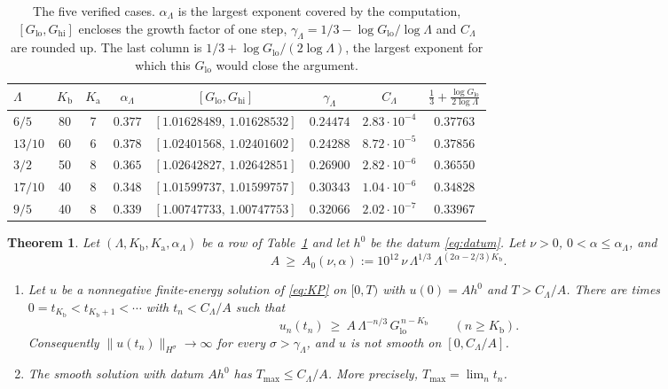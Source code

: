 \documentclass[12pt,reqno]{amsart}
\numberwithin{equation}{section}
\theoremstyle{plain}
\newtheorem{theorem}{Theorem}[section]
\theoremstyle{definition}
\theoremstyle{remark}
\newcommand{\Kb}{K_{\mathrm b}}
\newcommand{\Ka}{K_{\mathrm a}}
\newcommand{\Glo}{G_{\mathrm{lo}}}
\newcommand{\Ghi}{G_{\mathrm{hi}}}
\begin{document}
\begin{table}[ht]
\centering\small
\caption{The five verified cases. $\alpha_\Lambda$ is the largest exponent
covered by the computation, $[\Glo,\Ghi]$ encloses the growth factor of
one step, $\gamma_\Lambda=1/3-\log\Glo/\log\Lambda$ and $C_\Lambda$ are
rounded up. The last column is $1/3+\log\Glo/(2\log\Lambda)$, the
largest exponent for which this $\Glo$ would close the argument.}
\label{tab:main}
\begin{tabular}{@{}lccclccc@{}}
\toprule
$\Lambda$ & $\Kb$ & $\Ka$ & $\alpha_\Lambda$ & \multicolumn{1}{c}{$[\Glo,\Ghi]$} & $\gamma_\Lambda$ & $C_\Lambda$ & $\tfrac13+\tfrac{\log\Glo}{2\log\Lambda}$\\
\midrule
$6/5$   & 80 & 7 & $0.377$ & $[1.01628489,\,1.01628532]$ & $0.24474$ & $2.83\cdot10^{-4}$ & $0.37763$\\
$13/10$ & 60 & 6 & $0.378$ & $[1.02401568,\,1.02401602]$ & $0.24288$ & $8.72\cdot10^{-5}$ & $0.37856$\\
$3/2$   & 50 & 8 & $0.365$ & $[1.02642827,\,1.02642851]$ & $0.26900$ & $2.82\cdot10^{-6}$ & $0.36550$\\
$17/10$ & 40 & 8 & $0.348$ & $[1.01599737,\,1.01599757]$ & $0.30343$ & $1.04\cdot10^{-6}$ & $0.34828$\\
$9/5$   & 40 & 8 & $0.339$ & $[1.00747733,\,1.00747753]$ & $0.32066$ & $2.02\cdot10^{-7}$ & $0.33967$\\
\bottomrule
\end{tabular}
\end{table}

\begin{theorem}\label{thm:main}
Let $(\Lambda,\Kb,\Ka,\alpha_\Lambda)$ be a row of Table~\ref{tab:main} and
let $h^0$ be the datum \eqref{eq:datum}. Let $\nu>0$, $0<\alpha\le\alpha_\Lambda$, and
\begin{equation}\label{eq:A0}
  A\ \ge\ A_0(\nu,\alpha):=10^{12}\,\nu\,\Lambda^{1/3}\,\Lambda^{(2\alpha-2/3)\Kb}.
\end{equation}
\begin{enumerate}[label=\textup{(\alph*)}]
\item Let $u$ be a nonnegative finite-energy solution of \eqref{eq:KP} on
  $[0,T)$ with $u(0)=Ah^0$ and $T>C_\Lambda/A$. There are times
  $0=t_{\Kb}<t_{\Kb+1}<\dotsb$ with $t_n<C_\Lambda/A$ such that
  \[
    u_n(t_n)\ \ge\ A\,\Lambda^{-n/3}\,\Glo^{\,n-\Kb}\qquad(n\ge\Kb).
  \]
  Consequently $\|u(t_n)\|_{H^\sigma}\to\infty$ for every
  $\sigma>\gamma_\Lambda$, and $u$ is not smooth on $[0,C_\Lambda/A]$.
\item The smooth solution with datum $Ah^0$ has $T_{\max}\le C_\Lambda/A$.
  More precisely, $T_{\max}=\lim_n t_n$.
\end{enumerate}
\end{theorem}
\end{document}
